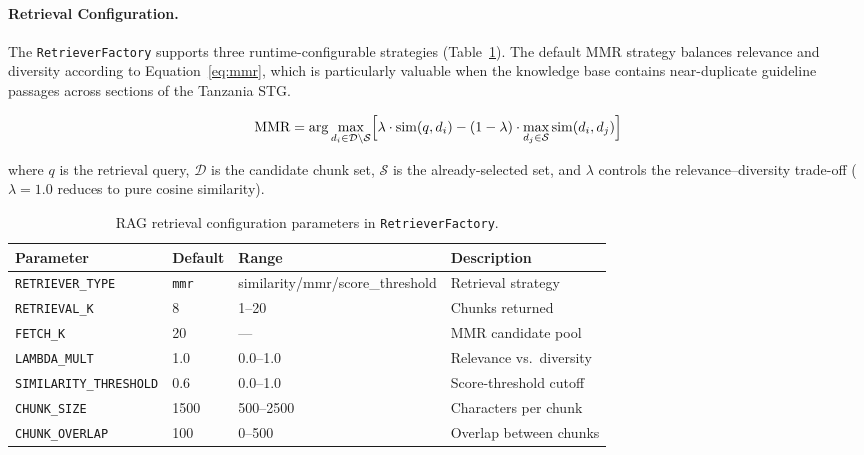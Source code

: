 \documentclass[12pt,a4paper]{report}
\begin{document}
	\paragraph{Retrieval Configuration.}
	The \texttt{RetrieverFactory} supports three runtime-configurable strategies
	(Table~\ref{tab:retrieval_config}). The default MMR strategy balances relevance and
	diversity according to Equation~\eqref{eq:mmr}, which is particularly valuable when the
	knowledge base contains near-duplicate guideline passages across sections of the Tanzania
	STG.
	
	\begin{equation}
		\text{MMR} = \arg\max_{d_i \in \mathcal{D}\setminus\mathcal{S}}
		\Bigl[\lambda \cdot \operatorname{sim}(q,d_i)
		- (1-\lambda) \cdot \max_{d_j \in \mathcal{S}} \operatorname{sim}(d_i,d_j)\Bigr]
		\label{eq:mmr}
	\end{equation}
	
	\noindent where $q$ is the retrieval query, $\mathcal{D}$ is the candidate chunk set,
	$\mathcal{S}$ is the already-selected set, and $\lambda$ controls the relevance--diversity
	trade-off ($\lambda = 1.0$ reduces to pure cosine similarity).
	
	\begin{table}[H]
		\centering
		\caption{RAG retrieval configuration parameters in \texttt{RetrieverFactory}.}
		\label{tab:retrieval_config}
		\begin{tabular}{llll}
			\toprule
			\textbf{Parameter} & \textbf{Default} & \textbf{Range} & \textbf{Description} \\
			\midrule
			\texttt{RETRIEVER\_TYPE}      & \texttt{mmr}  & similarity/mmr/score\_threshold & Retrieval strategy \\
			\texttt{RETRIEVAL\_K}         & 8             & 1--20           & Chunks returned \\
			\texttt{FETCH\_K}             & 20            & ---             & MMR candidate pool \\
			\texttt{LAMBDA\_MULT}         & 1.0           & 0.0--1.0        & Relevance vs.\ diversity \\
			\texttt{SIMILARITY\_THRESHOLD}& 0.6           & 0.0--1.0        & Score-threshold cutoff \\
			\texttt{CHUNK\_SIZE}          & 1500          & 500--2500       & Characters per chunk \\
			\texttt{CHUNK\_OVERLAP}       & 100           & 0--500          & Overlap between chunks \\
			\bottomrule
		\end{tabular}
	\end{table}
	
\end{document}

